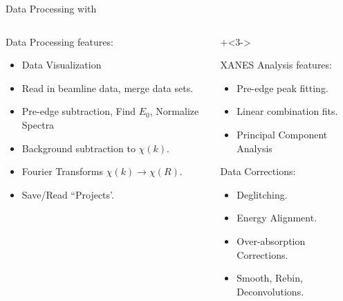 \begin{slide}{Data Processing with {\xasviewer}  }
\begin{cenpage}{135mm}
{{\begin{columns}[T]
\begin{column}{65mm}
      Data Processing  features:
      \begin{itemize}
      \item  Data Visualization
      \item  Read in beamline data, merge data sets.
      \item  Pre-edge subtraction, Find $E_0$, Normalize Spectra
      \item  Background subtraction  to $\chi(k)$.
      \item  Fourier Transforms  $\chi(k) \rightarrow \chi(R)$.
      \item  Save/Read ``Projects'.
      \end{itemize}
    \vfill

  \end{column}

    \begin{column}{65mm}
   \onslide+<3->

   XANES Analysis features:
   \begin{itemize}
   \item  Pre-edge peak fitting.
   \item  Linear combination fits.
   \item Principal Component Analysis
   \end{itemize}

   Data Corrections:
   \begin{itemize}
   \item  Deglitching.
   \item  Energy Alignment.
   \item  Over-absorption Corrections.
   \item Smooth, Rebin, Deconvolutions.
   \end{itemize}

 \end{column}
\end{columns}

}}
\end{cenpage}


\end{slide}

